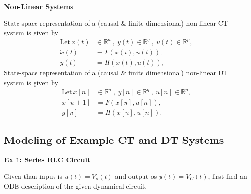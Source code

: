 \documentclass[twoside]{article}
\begin{document}
\textbf{Non-Linear Systems}

State-space representation of a (causal \& finite dimensional) non-linear CT system is given by
%
\begin{align*}
  \mathrm{Let} \ x(t) &\in \mathbb{R}^n \ , \ y(t) \in \mathbb{R}^q \ ,\  u(t) \in
  \mathbb{R}^p , \\
  \dot{x}(t) &= F(x(t),u(t)) , \\
  y(t) &= H(x(t),u(t)) , 
\end{align*}
%
State-space representation of a (causal \& finite dimensional) non-linear DT system is given by
%
\begin{align*}
  \mathrm{Let} \ x[n] &\in \mathbb{R}^n \ , \ y[n] \in \mathbb{R}^q \ ,\
                        u[n] \in \mathbb{R}^p , \\
  x[n+1] &= F(x[n],u[n]) , \\
  y[n] &= H(x[n],u[n]) , 
\end{align*}

\subsection{Modeling of Example CT and DT Systems}

\textbf{Ex 1: Series RLC Circuit}

Given than input is $u(t) = V_s(t)$ and output os $y(t) = V_C(t)$,
first find an ODE description of the given dynamical circuit. 
\end{document}
